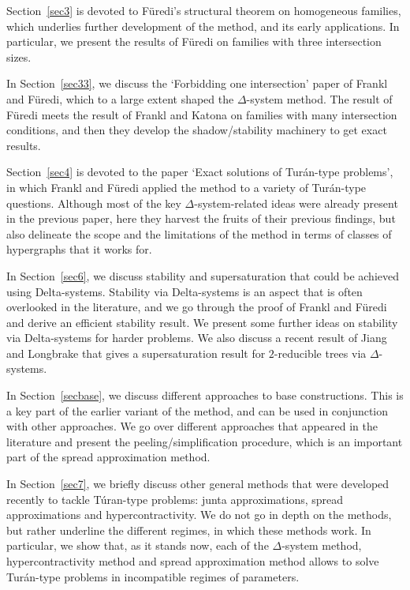 \documentclass[graybox]{svmult}
\begin{document}
Section~\ref{sec3} is devoted to F\"uredi's structural theorem on homogeneous families, which underlies further development of the method, and its early applications. In particular, we present the results of F\"uredi on families with three intersection sizes.

In Section~\ref{sec33}, we discuss the `Forbidding one intersection' paper of Frankl and F\"uredi, which to a large extent shaped the $\Delta$-system method. The result of F\"uredi meets the result of Frankl and Katona on families with many intersection conditions, and then they develop the shadow/stability machinery to get exact results.

Section~\ref{sec4} is devoted to the paper `Exact solutions of Tur\'an-type problems', in which Frankl and F\"uredi applied the method to a variety of Tur\'an-type questions. Although most of the key $\Delta$-system-related ideas were already present in the previous paper, here they harvest the fruits of their previous findings, but also delineate the scope and the limitations of the method in terms of classes of hypergraphs that it works for.

In Section~\ref{sec6}, we discuss stability and supersaturation that could be achieved using Delta-systems. Stability via Delta-systems is an aspect that is often overlooked in the literature, and we go through the proof of Frankl and F\"uredi \cite{FF1} and derive an efficient stability result. We present some further ideas on stability via Delta-systems for harder problems. We also discuss a recent result of Jiang and Longbrake that gives a supersaturation result for $2$-reducible trees via $\Delta$-systems.

In Section~\ref{secbase}, we discuss different approaches to base constructions. This is a key part of the earlier variant of the method, and can be used in conjunction with other approaches. We go over different approaches that appeared in the literature and  present the peeling/simplification procedure, which is an important part of the spread approximation method.

In Section~\ref{sec7}, we briefly discuss other general methods that were developed recently to tackle T\'uran-type problems: junta approximations, spread approximations and hypercontractivity. We do not go in depth on the methods, but rather underline the different regimes, in which these methods work. In particular, we show that, as it stands now, each of the $\Delta$-system method, hypercontractivity method and spread approximation method allows to solve Tur\'an-type problems in incompatible regimes of parameters.
\end{document}
